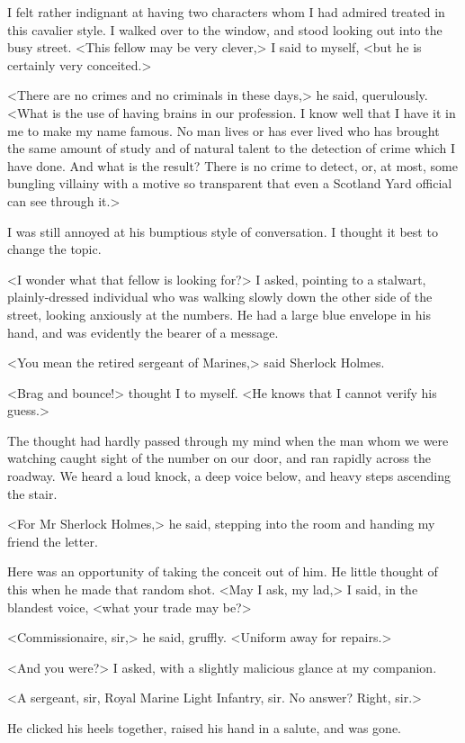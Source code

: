 I felt rather indignant at having two characters whom I had admired treated in this cavalier style. I walked over to the window, and stood looking out into the busy street. <This fellow may be very clever,> I said to myself, <but he is certainly very conceited.>

<There are no crimes and no criminals in these days,> he said, querulously. <What is the use of having brains in our profession. I know well that I have it in me to make my name famous. No man lives or has ever lived who has brought the same amount of study and of natural talent to the detection of crime which I have done. And what is the result? There is no crime to detect, or, at most, some bungling villainy with a motive so transparent that even a Scotland Yard official can see through it.>

I was still annoyed at his bumptious style of conversation. I thought it best to change the topic.

<I wonder what that fellow is looking for?> I asked, pointing to a stalwart, plainly-dressed individual who was walking slowly down the other side of the street, looking anxiously at the numbers. He had a large blue envelope in his hand, and was evidently the bearer of a message.

<You mean the retired sergeant of Marines,> said Sherlock Holmes.

<Brag and bounce!> thought I to myself. <He knows that I cannot verify his guess.>

The thought had hardly passed through my mind when the man whom we were watching caught sight of the number on our door, and ran rapidly across the roadway. We heard a loud knock, a deep voice below, and heavy steps ascending the stair.

<For Mr Sherlock Holmes,> he said, stepping into the room and handing my friend the letter.

Here was an opportunity of taking the conceit out of him. He little thought of this when he made that random shot. <May I ask, my lad,> I said, in the blandest voice, <what your trade may be?>

<Commissionaire, sir,> he said, gruffly. <Uniform away for repairs.>

<And you were?> I asked, with a slightly malicious glance at my companion.

<A sergeant, sir, Royal Marine Light Infantry, sir. No answer? Right, sir.>

He clicked his heels together, raised his hand in a salute, and was gone.